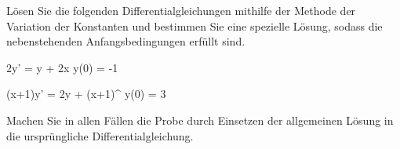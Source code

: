 \begin{atiTask}[
	title = Die Methode der Variation der Konstanten II
]
	Lösen Sie die folgenden Differentialgleichungen mithilfe der Methode der Variation der Konstanten und bestimmen Sie eine spezielle Lösung, sodass die nebenstehenden Anfangsbedingungen erfüllt sind.
	\begin{atiSubequations}
		\item{
			2y' = y + 2\sin x
			\separate
			y(0) = -1
		}
		\item{
			(x+1)y' = 2y + (x+1)^
			\separate
			y(0) = 3
		}
	\end{atiSubequations}
	Machen Sie in allen Fällen die Probe durch Einsetzen der allgemeinen Lösung in die ursprüngliche Differentialgleichung.
\end{atiTask}